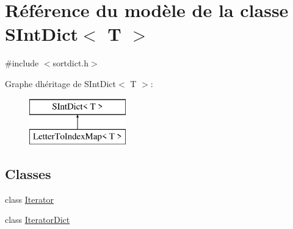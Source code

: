\hypertarget{class_s_int_dict}{}\section{Référence du modèle de la classe S\+Int\+Dict$<$ T $>$}
\label{class_s_int_dict}


{\ttfamily \#include $<$sortdict.\+h$>$}

Graphe d\textquotesingle{}héritage de S\+Int\+Dict$<$ T $>$\+:\begin{figure}[H]
\begin{center}
\leavevmode
\includegraphics[height=2.000000cm]{class_s_int_dict}
\end{center}
\end{figure}
\subsection*{Classes}
\begin{DoxyCompactItemize}
\item 
class \hyperlink{class_s_int_dict_1_1_iterator}{Iterator}
\item 
class \hyperlink{class_s_int_dict_1_1_iterator_dict}{Iterator\+Dict}
\end{DoxyCompactItemize}
